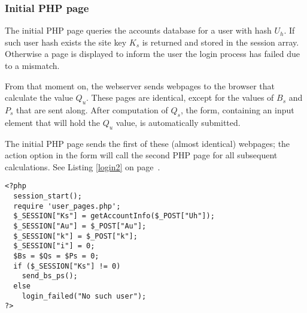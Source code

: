 \subsubsection{Initial PHP page}
The initial PHP page queries the accounts database for a user with hash $U_h$.
If such user hash exists the site key $K_s$ is returned and stored in the session array.
Otherwise a page is displayed to inform the user the login process has failed due to a mismatch.
\par
From that moment on,
the webserver sends webpages to the browser that calculate the value $Q_u$.
These pages are identical, except for the values of $B_s$ and $P_s$ that are sent along.
After computation of $Q_s$, the form,
containing an input element that will hold the $Q_u$ value,
is automatically submitted.
\par
The initial PHP page sends the first of these
(almost identical)
webpages;
the action option in the form will call the second PHP page for all subsequent calculations.
See Listing \ref{login2} on page~\pageref{login2}.
\lstset{language=PHP}
\begin{lstlisting}[frame=lines,float=tbhp,label=login2,title=login2.php,caption=Second Login Page]
<?php
  session_start();
  require 'user_pages.php';
  $_SESSION["Ks"] = getAccountInfo($_POST["Uh"]);
  $_SESSION["Au"] = $_POST["Au"];
  $_SESSION["k"] = $_POST["k"];
  $_SESSION["i"] = 0;
  $Bs = $Qs = $Ps = 0;
  if ($_SESSION["Ks"] != 0)
    send_bs_ps();
  else
    login_failed("No such user");
?>
\end{lstlisting}
